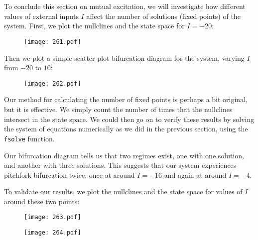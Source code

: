 \documentclass{article}
\begin{document}
\section{}



\section{}
To conclude this section on mutual excitation, we will investigate how different values of external inputs $I$ affect the number of solutions (fixed points) of the system. First, we plot the nullclines and the state space for $I = -20$:

\begin{figure}[ht]
    \centering
    \texttt{[image: 261.pdf]}
\end{figure}

Then we plot a simple scatter plot bifurcation diagram for the system, varying $I$ from $-20$ to $10$:

\begin{figure}[ht]
    \centering
    \texttt{[image: 262.pdf]}
\end{figure}

\FloatBarrier
Our method for calculating the number of fixed points is perhaps a bit original, but it is effective. We simply count the number of times that the nullclines intersect in the state space. We could then go on to verify these results by solving the system of equations numerically as we did in the previous section, using the \texttt{fsolve} function. 
\vspace{1em}

Our bifurcation diagram tells us that two regimes exist, one with one solution, and another with three solutions. This suggests that our system experiences pitchfork bifurcation twice, once at around $I = -16$ and again at around $I = -4$.
\vspace{1em}

To validate our results, we plot the nullclines and the state space for values of $I$ around these two points:

\begin{figure}[ht]
    \centering
    \begin{minipage}{0.35\textwidth}
        \texttt{[image: 263.pdf]}
    \end{minipage}
    \begin{minipage}{0.35\textwidth}
        \texttt{[image: 264.pdf]}
    \end{minipage}
\end{figure}
\end{document}

